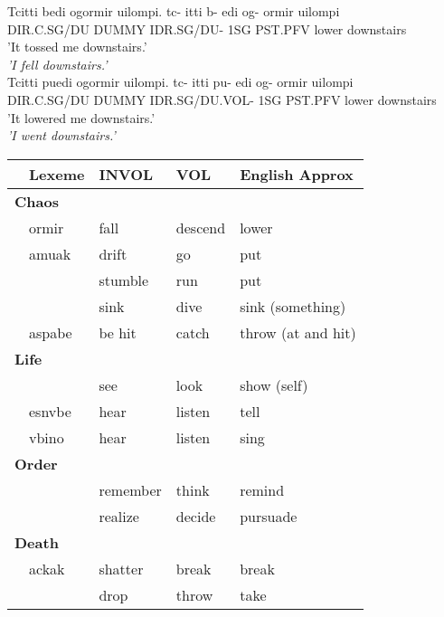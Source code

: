 \documentclass[11pt]{article}
\begin{document}
\begin{exe}
\ex \label{fall}
\begin{xlist}
\ex \label{fall:invol}
Tcitti bedi ogormir uilompi.
\gll
tc-       itti  b-         edi og-     ormir uilompi\\
DIR.C.SG/DU DUMMY IDR.SG/DU- 1SG PST.PFV lower  downstairs\\
\trans 
    {\textthin{}'It tossed me downstairs.'}\\
    \textit{'I fell downstairs.'}\\

\ex \label{fall:vol}
Tcitti puedi ogormir uilompi.
\gll
tc-       itti  pu-            edi og-     ormir    uilompi\\
DIR.C.SG/DU DUMMY IDR.SG/DU.VOL- 1SG PST.PFV lower downstairs\\
\trans 
    {\textthin{}'It lowered me downstairs.'}\\
    \textit{'I went downstairs.'}\\
\end{xlist}
\end{exe}



\begin{table}[H]
\begin{tabular}{ m{1em} m{5em} | m{5em} | m{5em}| m{10em} }
& Lexeme & INVOL & VOL & English Approx \\
\hline\hline
\multicolumn{5}{l}{ \textbf{Chaos} } \\
\hline
& ormir & fall & descend & lower \\ 
& amuak & drift & go & put \\ 
&       & stumble & run & put \\
&       & sink & dive & sink (something)\\ 

& aspabe & be hit & catch & throw (at and hit) \\ 

\hline
\multicolumn{4}{l}{ \textbf{Life} } \\
\hline
&        & see & look & show (self)\\ 
& esnvbe & hear & listen & tell\\ 
& vbino  & hear & listen & sing\\ 
       
\hline
\multicolumn{4}{l}{ \textbf{Order} } \\
\hline
&       & remember & think & remind \\ 
&       & realize & decide & pursuade\\ 
       
\hline
\multicolumn{4}{l}{ \textbf{Death} } \\
\hline
& ackak  & shatter & break & break \\
&       & drop & throw & take\\  

\end{tabular}
\end{table}
\end{document}
